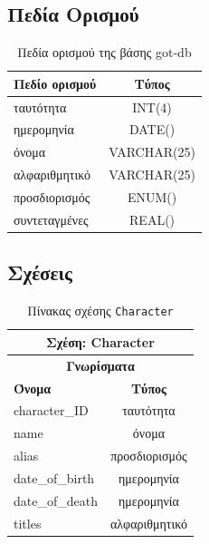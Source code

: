\documentclass[../main.tex]{subfiles}
\begin{document}
\subsection{Πεδία Ορισμού}

\renewcommand{\arraystretch}{1.5}
\textwidth
\begin{table}[H]
	\centering
	\begin{tabulary}{\textwidth}{L|C}
		\hline
		\textbf{Πεδίο ορισμού}       & \textbf{Τύπος} \\
		\hline
		ταυτότητα              &   INT(4)  \\
		ημερομηνία             &   DATE()  \\
		όνομα                  &   VARCHAR(25)  \\
		αλφαριθμητικό          &   VARCHAR(25)  \\
		προσδιορισμός          &   ENUM()  \\
		συντεταγμένες          &   REAL()  \\
		\hline
	\end{tabulary}
	\caption{Πεδία ορισμού της βάσης got-db}
	\label{tab:scopes}
\end{table}


\newenvironment{relation}[1]
{\renewcommand{\arraystretch}{1.4}
	\newcommand{\temp}{#1}
	\begin{table}[H]
		\centering
		\begin{tabular}[t]{l|c}
			\hline
			\multicolumn{2}{c}{Σχέση: \textbf{#1}}  \\
			\hline
			\hline
			\multicolumn{2}{c}{\textbf{Γνωρίσματα}} \\
			\hline
			\textbf{Όνομα} & \textbf{Τύπος}         \\
			}
			{
		\end{tabular}
		\caption{Πίνακας σχέσης \texttt{\temp}}
	\end{table}
}

\subsection{Σχέσεις}

\begin{relation}{Character}
	character\_ID         &  ταυτότητα \\
	name                  &  όνομα \\
	alias                 &  προσδιορισμός \\
	date\_of\_birth       &  ημερομηνία \\
	date\_of\_death       &  ημερομηνία \\
	titles                &  αλφαριθμητικό \\
\end{relation}
\end{document}
